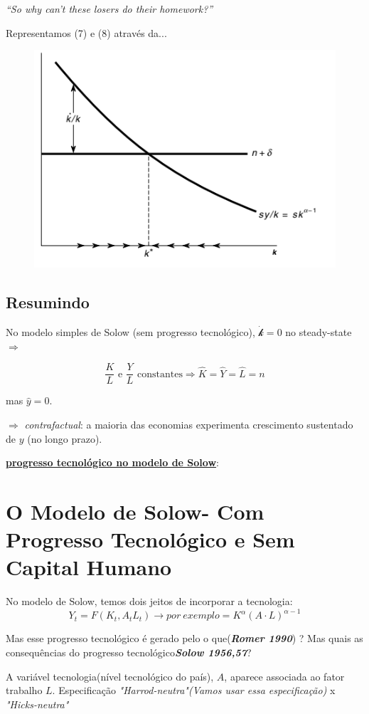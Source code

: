 \documentclass[a4paper,12pt]{article}[abntex2]
\begin{document}
\textit{``So why can't these losers do their homework?''}

Representamos (7) e (8) através da...

\begin{figure}[H]
    \centering
    \includegraphics[width=0.5\linewidth]{Imagens/a7i5.png}
\end{figure}

\subsection{\textbf{Resumindo}}
No modelo simples de Solow (sem progresso tecnológico), \( \dot{\mathcal{k}} = 0 \) no steady-state \(\Rightarrow\)

\[
\frac{K}{L} \text{ e } \frac{Y}{L} \text{ constantes} \Rightarrow \hat{K} = \hat{Y} = \hat{L} = n
\]

mas \( \hat{y} = 0 \).


\(\Rightarrow\) \textit{contrafactual}: a maioria das economias experimenta crescimento sustentado de \( y \) (no longo prazo).

\underline{\textbf{progresso tecnológico no modelo de Solow}}:
\newpage

\section{\textbf{O Modelo de Solow- Com Progresso Tecnológico e Sem Capital Humano}}

No modelo de Solow, temos dois jeitos de incorporar a tecnologia:
\[
Y_t=F(K_t, A_tL_t)\rightarrow por \ exemplo = K^{\alpha}(A\cdot L)^{\alpha-1}
\]

Mas esse progresso tecnológico é gerado pelo o que(\textit{\textbf{Romer 1990}}) ? Mas quais as consequências do progresso tecnológico\textit{\textbf{Solow 1956,57}}? 

A variável tecnologia(nível tecnológico do país), \(A\), aparece associada ao fator trabalho \(L\). Especificação \textit{"Harrod-neutra"(Vamos usar essa especificação)} x \textit{"Hicks-neutra"}
\end{document}
